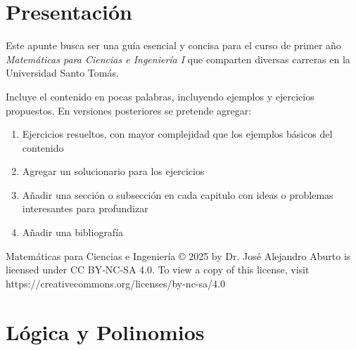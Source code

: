 \documentclass[11pt, twoside]{book}
\begin{document}

\restoregeometry
\nopagecolor

\tableofcontents

\chapter*{Presentación}
Este apunte busca ser una guía esencial y concisa para el curso de primer año \emph{Matemáticas para Ciencias e Ingeniería I} que comparten diversas carreras en la Universidad Santo Tomás.


Incluye el contenido en pocas palabras, incluyendo ejemplos y ejercicios propuestos. En versiones posteriores se pretende agregar:
\begin{enumerate}[label=\roman*)]
    \item Ejercicios resueltos, con mayor complejidad que los ejemplos básicos del contenido
    \item Agregar un solucionario para los ejercicios
    \item Añadir una sección o subsección en cada capitulo con ideas o problemas interesantes para profundizar
    \item Añadir una bibliografía
\end{enumerate}
\vfill
\noindent
Matemáticas para Ciencias e Ingeniería © 2025 by Dr. José Alejandro Aburto is licensed under CC BY-NC-SA 4.0. To view a copy of this license, visit https://creativecommons.org/licenses/by-nc-sa/4.0

\chapter{Lógica y Polinomios}
\end{document}
